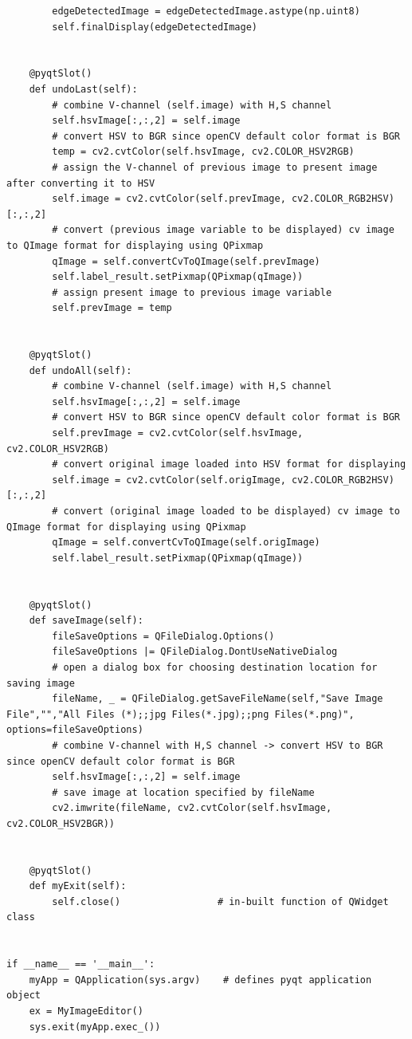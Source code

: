 \documentclass[letterpaper, 10 pt, conference]{ieeeconf}  %
\begin{document}
\begin{mdframed}
\begin{lstlisting}
        edgeDetectedImage = edgeDetectedImage.astype(np.uint8)
        self.finalDisplay(edgeDetectedImage)

    
    @pyqtSlot()
    def undoLast(self):
        # combine V-channel (self.image) with H,S channel
        self.hsvImage[:,:,2] = self.image
        # convert HSV to BGR since openCV default color format is BGR
        temp = cv2.cvtColor(self.hsvImage, cv2.COLOR_HSV2RGB)
        # assign the V-channel of previous image to present image after converting it to HSV
        self.image = cv2.cvtColor(self.prevImage, cv2.COLOR_RGB2HSV)[:,:,2]
        # convert (previous image variable to be displayed) cv image to QImage format for displaying using QPixmap
        qImage = self.convertCvToQImage(self.prevImage)
        self.label_result.setPixmap(QPixmap(qImage))
        # assign present image to previous image variable 
        self.prevImage = temp

    
    @pyqtSlot()
    def undoAll(self):
        # combine V-channel (self.image) with H,S channel
        self.hsvImage[:,:,2] = self.image
        # convert HSV to BGR since openCV default color format is BGR
        self.prevImage = cv2.cvtColor(self.hsvImage, cv2.COLOR_HSV2RGB)
        # convert original image loaded into HSV format for displaying 
        self.image = cv2.cvtColor(self.origImage, cv2.COLOR_RGB2HSV)[:,:,2]
        # convert (original image loaded to be displayed) cv image to QImage format for displaying using QPixmap
        qImage = self.convertCvToQImage(self.origImage)
        self.label_result.setPixmap(QPixmap(qImage))

    
    @pyqtSlot()
    def saveImage(self):
        fileSaveOptions = QFileDialog.Options()
        fileSaveOptions |= QFileDialog.DontUseNativeDialog
        # open a dialog box for choosing destination location for saving image
        fileName, _ = QFileDialog.getSaveFileName(self,"Save Image File","","All Files (*);;jpg Files(*.jpg);;png Files(*.png)", options=fileSaveOptions)
        # combine V-channel with H,S channel -> convert HSV to BGR since openCV default color format is BGR
        self.hsvImage[:,:,2] = self.image
        # save image at location specified by fileName
        cv2.imwrite(fileName, cv2.cvtColor(self.hsvImage, cv2.COLOR_HSV2BGR))

    
    @pyqtSlot()
    def myExit(self):
        self.close()                 # in-built function of QWidget class


if __name__ == '__main__':
    myApp = QApplication(sys.argv)    # defines pyqt application object 
    ex = MyImageEditor()
    sys.exit(myApp.exec_())
\end{lstlisting}
\end{mdframed}
\end{document}
